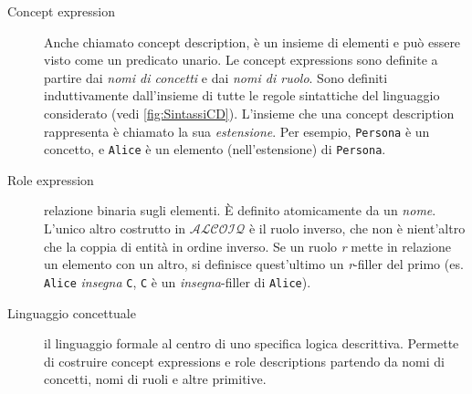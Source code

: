 \begin{description}
	\item[Concept expression] Anche chiamato concept description, è un insieme di elementi e può essere visto come un predicato unario. Le concept expressions sono definite a partire dai \textit{nomi di concetti} e dai \textit{nomi di ruolo}. Sono definiti induttivamente dall’insieme di tutte le regole sintattiche del linguaggio considerato (vedi \autoref{fig:SintassiCD}). L’insieme che una concept description rappresenta è chiamato la sua \textit{estensione}. Per esempio, \texttt{Persona} è un concetto, e \texttt{Alice} è un elemento (nell’estensione) di \texttt{Persona}.
	\item[Role expression] relazione binaria sugli elementi. È definito atomicamente da un \textit{nome}. L'unico altro costrutto in $\mathcal{ALCOIQ}$ è il ruolo inverso, che non è nient'altro che la coppia di entità in ordine inverso. Se un ruolo \textit{r} mette in relazione un elemento con un altro, si definisce quest’ultimo un \textit{r}-filler del primo (es. \texttt{Alice} \textit{insegna} \texttt{C}, \texttt{C} è un \textit{insegna}-filler di \texttt{Alice}).
	\item[Linguaggio concettuale] il linguaggio formale al centro di uno specifica logica descrittiva. Permette di costruire concept expressions e role descriptions partendo da nomi di concetti, nomi di ruoli e altre primitive.
\end{description}

